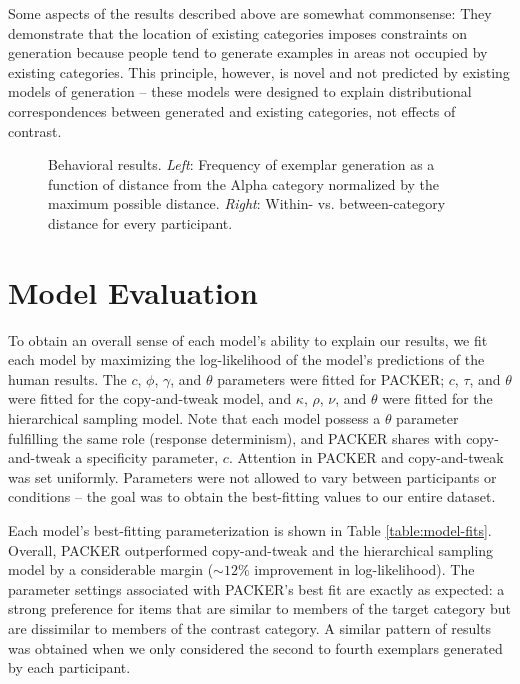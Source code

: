 \documentclass[10pt,letterpaper]{article}
\newcommand\inputpgf[2]{{
\let\pgfimageWithoutPath\pgfimage
\renewcommand{\pgfimage}[2][]{\pgfimageWithoutPath[##1]{#1/##2}}

}}
\begin{document}
Some aspects of the results described above are somewhat commonsense: They demonstrate that the location of existing categories imposes constraints on generation because people tend to generate examples in areas not occupied by existing categories. This principle, however, is novel and not predicted by existing models of generation -- these models were designed to explain distributional correspondences between generated and existing categories, not effects of contrast.  

\begin{figure}
    \begin{center}
    \inputpgf{figs/}{distance.figs.pgf}
    \caption{Behavioral results. \textit{Left}: Frequency of exemplar generation as a function of distance from the Alpha category normalized by the maximum possible distance. \textit{Right}: Within- vs. between-category distance for every participant. }
    \label{fig:distance.figs}
    \end{center}
\end{figure}


\section{Model Evaluation}
To obtain an overall sense of each model's ability to explain our results, we fit each model by maximizing the log-likelihood of the model's predictions of the human results. The $c$, $\phi$, $\gamma$, and $\theta$ parameters were fitted for PACKER; $c$, $\tau$, and $\theta$ were fitted for the copy-and-tweak model, and $\kappa$, $\rho$, $\nu$, and $\theta$ were fitted for the hierarchical sampling model. Note that each model possess a $\theta$ parameter fulfilling the same role (response determinism), and PACKER shares with copy-and-tweak a specificity parameter, $c$. Attention in PACKER and copy-and-tweak was set uniformly. Parameters were not allowed to vary between participants or conditions -- the goal was to obtain the best-fitting values to our entire dataset.

Each model's best-fitting parameterization is shown in Table \ref{table:model-fits}. Overall, PACKER outperformed copy-and-tweak and the hierarchical sampling model by a considerable margin ($\sim12\%$ improvement in log-likelihood). The parameter settings associated with PACKER's best fit are exactly as expected: a strong preference for items that are similar to members of the target category but are dissimilar to members of the contrast category. A similar pattern of results was obtained when we only considered the second to fourth exemplars generated by each participant.
\end{document}
